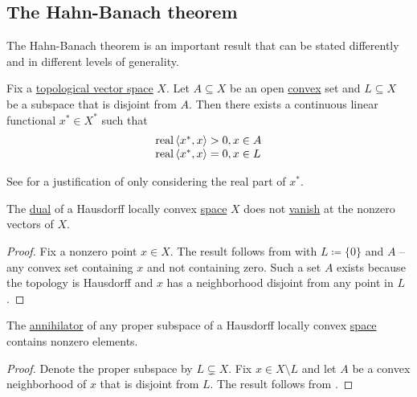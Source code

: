 \subsection{The Hahn-Banach theorem}\label{subsec:hahn_banach}

The Hahn-Banach theorem is an important result that can be stated differently and in different levels of generality.

\begin{theorem}\label{thm:geometric_hahn_banach}
  Fix a \hyperref[def:topological_vector_space]{topological vector space} \( X \). Let \( A \subseteq X \) be an open \hyperref[def:convex_set]{convex} set and \( L \subseteq X \) be a subspace that is disjoint from \( A \). Then there exists a continuous linear functional \( x^* \in X^* \) such that
  \begin{equation*}
    \begin{array}{l}
      \operatorname{real} \left\langle x^*, x \right\rangle > 0, x \in A \\
      \operatorname{real} \left\langle x^*, x \right\rangle = 0, x \in L
    \end{array}
  \end{equation*}

  See  for a justification of only considering the real part of \( x^* \).
\end{theorem}

\begin{corollary}\label{thm:hahn_banach_implies_functionals_vanish_nowhere}
  The \hyperref[def:dual_vector_space]{dual} of a Hausdorff locally convex \hyperref[def:locally_convex_space]{space} \( X \) does not \hyperref[def:functions_vanish_nowhere]{vanish} at the nonzero vectors of \( X \).
\end{corollary}
\begin{proof}
  Fix a nonzero point \( x \in X \). The result follows from  with \( L \coloneqq \{ 0 \} \) and \( A \) -- any convex set containing \( x \) and not containing zero. Such a set \( A \) exists because the topology is Hausdorff and \( x \) has a neighborhood disjoint from any point in \( L \).
\end{proof}

\begin{corollary}\label{thm:hahn_banach_implies_annihilator_nontrivial}
  The \hyperref[def:vector_space_annihilator]{annihilator} of any proper subspace of a Hausdorff locally convex \hyperref[def:locally_convex_space]{space} contains nonzero elements.
\end{corollary}
\begin{proof}
  Denote the proper subspace by \( L \subsetneq X \). Fix \( x \in X \setminus L \) and let \( A \) be a convex neighborhood of \( x \) that is disjoint from \( L \). The result follows from .
\end{proof}

